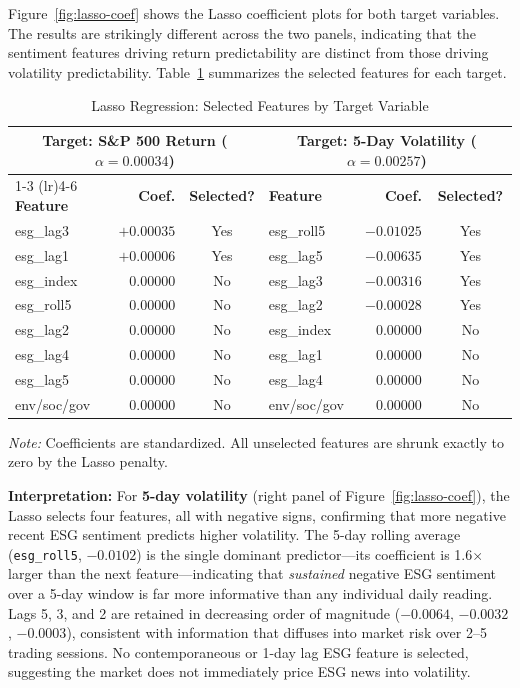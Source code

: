 \documentclass[12pt,a4paper]{article}
\begin{document}
Figure~\ref{fig:lasso-coef} shows the Lasso coefficient plots for both target variables. The results are strikingly different across the two panels, indicating that the sentiment features driving return predictability are distinct from those driving volatility predictability. Table~\ref{tab:lasso} summarizes the selected features for each target.

\begin{table}[H]
    \centering
    \caption{Lasso Regression: Selected Features by Target Variable}
    \label{tab:lasso}
    \begin{tabular}{lrclrc}
        \toprule
        \multicolumn{3}{c}{\textbf{Target: S\&P 500 Return} ($\alpha = 0.00034$)} &
        \multicolumn{3}{c}{\textbf{Target: 5-Day Volatility} ($\alpha = 0.00257$)} \\
        \cmidrule(lr){1-3} \cmidrule(lr){4-6}
        \textbf{Feature} & \textbf{Coef.} & \textbf{Selected?} &
        \textbf{Feature} & \textbf{Coef.} & \textbf{Selected?} \\
        \midrule
        esg\_lag3  & $+0.00035$ & Yes &  esg\_roll5  & $-0.01025$ & Yes \\
        esg\_lag1  & $+0.00006$ & Yes &  esg\_lag5   & $-0.00635$ & Yes \\
        esg\_index & $0.00000$  & No  &  esg\_lag3   & $-0.00316$ & Yes \\
        esg\_roll5 & $0.00000$  & No  &  esg\_lag2   & $-0.00028$ & Yes \\
        esg\_lag2  & $0.00000$  & No  &  esg\_index  & $0.00000$  & No  \\
        esg\_lag4  & $0.00000$  & No  &  esg\_lag1   & $0.00000$  & No  \\
        esg\_lag5  & $0.00000$  & No  &  esg\_lag4   & $0.00000$  & No  \\
        env/soc/gov & $0.00000$ & No  &  env/soc/gov & $0.00000$  & No  \\
        \bottomrule
    \end{tabular}
    \vspace{0.3cm}
    \small{\textit{Note:} Coefficients are standardized. All unselected features are shrunk exactly to zero by the Lasso penalty.}
\end{table}

\textbf{Interpretation:} For \textbf{5-day volatility} (right panel of Figure~\ref{fig:lasso-coef}), the Lasso selects four features, all with negative signs, confirming that more negative recent ESG sentiment predicts higher volatility. The 5-day rolling average (\texttt{esg\_roll5}, $-0.0102$) is the single dominant predictor---its coefficient is 1.6$\times$ larger than the next feature---indicating that \emph{sustained} negative ESG sentiment over a 5-day window is far more informative than any individual daily reading. Lags 5, 3, and 2 are retained in decreasing order of magnitude ($-0.0064$, $-0.0032$, $-0.0003$), consistent with information that diffuses into market risk over 2--5 trading sessions. No contemporaneous or 1-day lag ESG feature is selected, suggesting the market does not immediately price ESG news into volatility.
\end{document}
